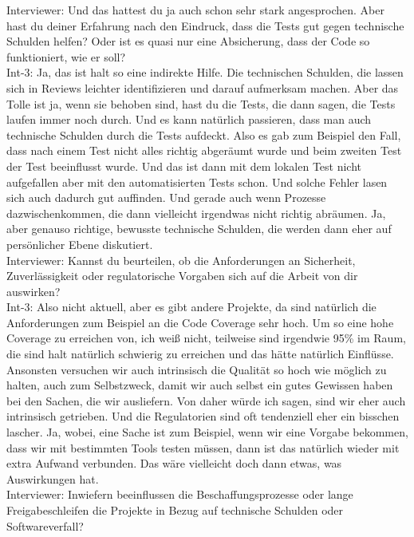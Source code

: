 Interviewer: Und das hattest du ja auch schon sehr stark angesprochen. Aber hast du deiner Erfahrung nach den Eindruck, dass die Tests gut gegen technische Schulden helfen? Oder ist es quasi nur eine Absicherung, dass der Code so funktioniert, wie er soll?\\
Int-3: Ja, das ist halt so eine indirekte Hilfe. Die technischen Schulden, die lassen sich in Reviews leichter identifizieren und darauf aufmerksam machen. Aber das Tolle ist ja, wenn sie behoben sind, hast du die Tests, die dann sagen, die Tests laufen immer noch durch. Und es kann natürlich passieren, dass man auch technische Schulden durch die Tests aufdeckt. Also es gab zum Beispiel den Fall, dass nach einem Test nicht alles richtig abgeräumt wurde und beim zweiten Test der Test beeinflusst wurde. Und das ist dann mit dem lokalen Test nicht aufgefallen aber mit den automatisierten Tests schon. Und solche Fehler lasen sich auch dadurch gut auffinden. Und gerade auch wenn Prozesse dazwischenkommen, die dann vielleicht irgendwas nicht richtig abräumen. Ja, aber genauso richtige, bewusste technische Schulden, die werden dann eher auf persönlicher Ebene diskutiert. \\
Interviewer: Kannst du beurteilen, ob die Anforderungen an Sicherheit, Zuverlässigkeit oder regulatorische Vorgaben sich auf die Arbeit von dir auswirken?\\
Int-3: Also nicht aktuell, aber es gibt andere Projekte, da sind natürlich die Anforderungen zum Beispiel an die Code Coverage sehr hoch. Um so eine hohe Coverage zu erreichen von, ich weiß nicht, teilweise sind irgendwie 95\% im Raum, die sind halt natürlich schwierig zu erreichen und das hätte natürlich Einflüsse. Ansonsten versuchen wir auch intrinsisch die Qualität so hoch wie möglich zu halten, auch zum Selbstzweck, damit wir auch selbst ein gutes Gewissen haben bei den Sachen, die wir ausliefern. Von daher würde ich sagen, sind wir eher auch intrinsisch getrieben. Und die Regulatorien sind oft tendenziell eher ein bisschen lascher. Ja, wobei, eine Sache ist zum Beispiel, wenn wir eine Vorgabe bekommen, dass wir mit bestimmten Tools testen müssen, dann ist das natürlich wieder mit extra Aufwand verbunden. Das wäre vielleicht doch dann etwas, was Auswirkungen hat.\\
Interviewer: Inwiefern beeinflussen die Beschaffungsprozesse oder lange Freigabeschleifen die Projekte in Bezug auf technische Schulden oder Softwareverfall?\\
